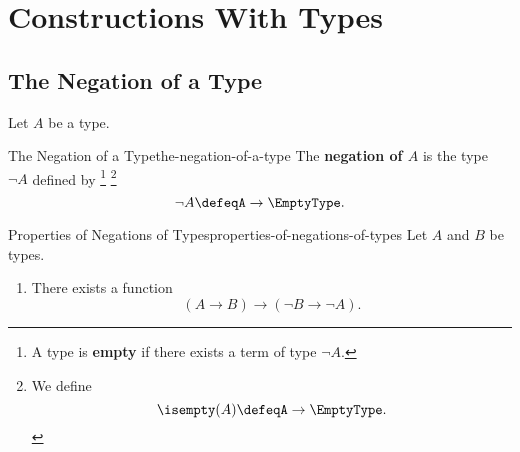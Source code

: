\section{Constructions With Types}\label{section-constructions-with-types}
\subsection{The Negation of a Type}\label{subsection-the-negation-of-a-type}
Let $A$ be a type.
\begin{definition}{The Negation of a Type}{the-negation-of-a-type}%
    The \textbf{negation of $A$} is the type $\neg A$ defined by%
    \footnote{%
        A type is \textbf{empty} if there exists a term of type $\neg A$.
    }%
    \footnote{%
        We define
        \[
            \isempty(A)%
            \defeq%
            A%
            \to%
            \EmptyType.%
        \]%
        \par\vspace*{\TCBBoxCorrection}
    }%
    \[
        \neg A%
        \defeq%
        A\to\EmptyType.%
    \]%
\end{definition}
\begin{proposition}{Properties of Negations of Types}{properties-of-negations-of-types}%
    Let $A$ and $B$ be types.
    \begin{enumerate}
        \item\label{properties-of-negations-of-types-contrapositive}There exists a function
            \[
                (A\to B)%
                \to
                (\neg B\to\neg A).%
            \]%
    \end{enumerate}
\end{proposition}

